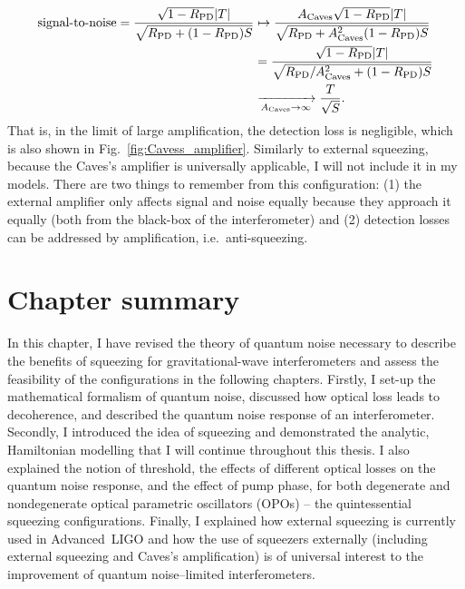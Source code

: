 \begin{align}\text{signal-to-noise} = \frac{\sqrt{1-R_\text{PD}}\abs{T}}{\sqrt{R_\text{PD}+(1-R_\text{PD})S}}&\mapsto\frac{A_\text{Caves}\sqrt{1-R_\text{PD}}\abs{T}}{\sqrt{R_\text{PD}+A_\text{Caves}^2(1-R_\text{PD})S}}\\
&=\frac{\sqrt{1-R_\text{PD}}\abs{T}}{\sqrt{R_\text{PD}/A_\text{Caves}^2+(1-R_\text{PD})S}}\\
&\xrightarrow[A_\text{Caves}\rightarrow\infty]{} \frac{T}{\sqrt S}.
\end{align}
That is, in the limit of large amplification, the detection loss is negligible, which is also shown in Fig.~\ref{fig:Cavess_amplifier}. Similarly to external squeezing, because the Caves's amplifier is universally applicable, I will not include it in my models. There are two things to remember from this configuration: (1) the external amplifier only affects signal and noise equally because they approach it equally (both from the black-box of the interferometer) and (2) detection losses can be addressed by amplification, i.e.\ anti-squeezing.


\section{Chapter summary}

In this chapter, I have revised the theory of quantum noise necessary to describe the benefits of squeezing for gravitational-wave interferometers and assess the feasibility of the configurations in the following chapters. Firstly, I set-up the mathematical formalism of quantum noise, discussed how optical loss leads to decoherence, and described the quantum noise response of an interferometer. Secondly, I introduced the idea of squeezing and demonstrated the analytic, Hamiltonian modelling that I will continue throughout this thesis. I also explained the notion of threshold, the effects of different optical losses on the quantum noise response, and the effect of pump phase, for both degenerate and nondegenerate optical parametric oscillators (OPOs) -- the quintessential squeezing configurations. Finally, I explained how external squeezing is currently used in Advanced~LIGO and how the use of squeezers externally (including external squeezing and Caves's amplification) is of universal interest to the improvement of quantum noise--limited interferometers. %


